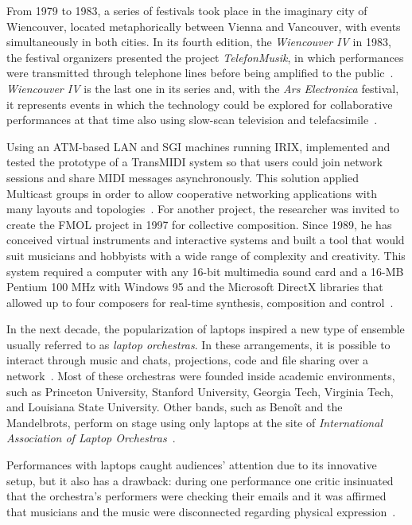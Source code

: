 From 1979 to 1983, a series of festivals took place in the imaginary city of Wiencouver, located metaphorically between Vienna and Vancouver, with events simultaneously in both cities.
In its fourth edition, the \textit{Wiencouver IV} in 1983, the festival organizers presented the project \textit{TelefonMusik}, in which performances were transmitted through telephone lines before being amplified to the public~\citep[p.~19-20]{Corby2013}.
\textit{Wiencouver IV} is the last one in its series and, with the \textit{Ars Electronica} festival, it represents events in which the technology could be explored for collaborative performances at that time also using slow-scan television and telefacsimile~\citep[p.~146-47]{Gere2006art}. 

Using an ATM-based LAN and SGI machines running IRIX, \cite{Gang1997transmidi} implemented and tested the prototype of a TransMIDI system so that users could join network sessions and share MIDI messages asynchronously.
This solution applied Multicast groups in order to allow cooperative networking applications with many layouts and topologies~\citep{Gang1997transmidi}.
For another project, the researcher  was invited to create the FMOL project in 1997 for collective composition.
Since 1989, he has conceived virtual instruments and interactive systems and built a tool that would suit musicians and hobbyists with a wide range of complexity and creativity.
This system required a computer with any 16-bit multimedia sound card and a 16-MB Pentium 100 MHz with Windows 95 and the Microsoft DirectX libraries that allowed up to four composers for real-time synthesis, composition and control~\citep{Jorda1999fmol}.

In the next decade, the popularization of laptops inspired a new type of ensemble usually referred to as \textit{laptop orchestras}.
In these arrangements, it is possible to interact through music and chats, projections, code and file sharing over a network~\citep{Gasperini2011laptop}.
Most of these orchestras were founded inside academic environments, such as Princeton University, Stanford University, Georgia Tech, Virginia Tech, and Louisiana State University.
Other bands, such as Benoît and the Mandelbrots, perform on stage using only laptops at the site of \textit{International Association of Laptop Orchestras}~\citep{IALO2016laptop}.

Performances with laptops caught audiences' attention due to its innovative setup, but it also has a drawback: during one performance one critic insinuated that the orchestra's performers were checking their emails and it was affirmed that musicians and the music were disconnected regarding physical expression~\citep{Trueman2007}.

